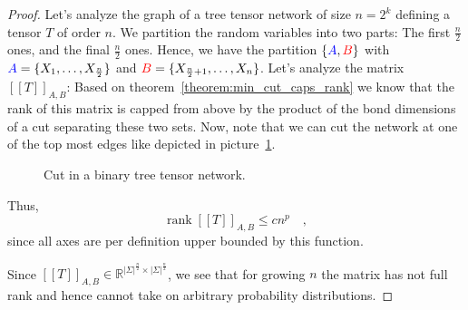 \documentclass[../../main.tex]{subfiles}
\begin{document}
    \begin{proof}
        Let's analyze the graph of a tree tensor network of size $n = 2^k$ defining a tensor $T$ of order $n$. We partition the random variables into two parts: The first $\frac{n}{2}$ ones, and the final $\frac{n}{2}$ ones. Hence, we have the partition $\{\textcolor{blue}{A}, \textcolor{red}{B}\}$ with $\textcolor{blue}{A} = \{X_1, \dots, X_{\frac{n}{2}}\}$ and $\textcolor{red}{B} = \{X_{\frac{n}{2} + 1}, \dots, X_n\}$. Let's analyze the matrix
        $[[T]]_{A,B}$: Based on theorem~\ref{theorem:min_cut_caps_rank} we know that the rank of this matrix is capped from above by the product of the bond dimensions of a cut separating these two sets. Now, note that we can cut the network at one of the top most edges like depicted in picture~\ref{pic:cut_bttn}.
        \begin{figure}[h]
            \centering
            \caption{Cut in a binary tree tensor network.}
            \label{pic:cut_bttn}
        \end{figure}

        Thus,
        \[
            \operatorname{rank} [[T]]_{A,B} \leq cn^p \quad ,
        \]
        since all axes are per definition upper bounded by this function.

        Since $[[T]]_{A,B} \in \mathbb{R}^{|\Sigma|^{\frac{n}{2}} \times |\Sigma|^{\frac{n}{2}}}$, we see that for growing $n$ the matrix has not full rank and hence cannot take on arbitrary probability distributions.
    \end{proof}
\end{document}
